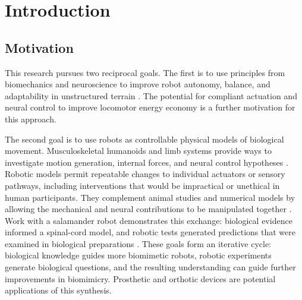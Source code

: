 \chapter{Introduction}\label{ch:introduction}
\graphicspath{{../Figures/10-introduction/}{figs/10-introduction/}}

\section{Motivation}

This research pursues two reciprocal goals. The first is to use principles from biomechanics and neuroscience to improve robot autonomy, balance, and adaptability in unstructured terrain \citep{frey_legged_2026, ha_learning_2025, ijspeert_amphibious_2020}. The potential for compliant actuation and neural control to improve locomotor energy economy is a further motivation for this approach.

The second goal is to use robots as controllable physical models of biological movement. Musculoskeletal humanoids and limb systems provide ways to investigate motion generation, internal forces, and neural control hypotheses \citep{asano_design_2017, hitzmann_anthropomorphic_2018}. Robotic models permit repeatable changes to individual actuators or sensory pathways, including interventions that would be impractical or unethical in human participants. They complement animal studies and numerical models by allowing the mechanical and neural contributions to be manipulated together \citep{shin_constructive_2018, goldsmith_investigating_2021}. Work with a salamander robot demonstrates this exchange: biological evidence informed a spinal-cord model, and robotic tests generated predictions that were examined in biological preparations \citep{ijspeert_swimming_2007}. These goals form an iterative cycle: biological knowledge guides more biomimetic robots, robotic experiments generate biological questions, and the resulting understanding can guide further improvements in biomimicry. Prosthetic and orthotic devices are potential applications of this synthesis.

